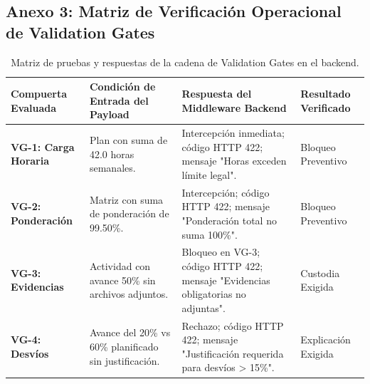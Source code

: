 \documentclass[12pt,a4paper]{article}
\begin{document}
\subsection*{Anexo 3: Matriz de Verificación Operacional de Validation Gates}
\begin{table}[H]
\centering
\small
\renewcommand{\arraystretch}{1.15}
\begin{tabularx}{\textwidth}{|>{\hsize=0.75\hsize\raggedright\arraybackslash\bfseries\footnotesize}X|>{\hsize=1.25\hsize\raggedright\arraybackslash\footnotesize}X|>{\hsize=1.35\hsize\raggedright\arraybackslash\footnotesize}X|>{\hsize=0.65\hsize\centering\arraybackslash\footnotesize}X|}
\hline
\rowcolor{tableheader}
\textbf{Compuerta Evaluada} & \textbf{Condición de Entrada del Payload} & \textbf{Respuesta del Middleware Backend} & \textbf{Resultado Verificado} \\
\hline
VG-1: Carga Horaria & Plan con suma de 42.0 horas semanales. & Intercepción inmediata; código HTTP 422; mensaje "Horas exceden límite legal". & Bloqueo Preventivo \\
\hline
VG-2: Ponderación & Matriz con suma de ponderación de 99.50\%. & Intercepción; código HTTP 422; mensaje "Ponderación total no suma 100\%". & Bloqueo Preventivo \\
\hline
VG-3: Evidencias & Actividad con avance 50\% sin archivos adjuntos. & Bloqueo en VG-3; código HTTP 422; mensaje "Evidencias obligatorias no adjuntas". & Custodia Exigida \\
\hline
VG-4: Desvíos & Avance del 20\% vs 60\% planificado sin justificación. & Rechazo; código HTTP 422; mensaje "Justificación requerida para desvíos > 15\%". & Explicación Exigida \\
\hline
\end{tabularx}
\caption{Matriz de pruebas y respuestas de la cadena de Validation Gates en el backend.}
\end{table}
\end{document}
